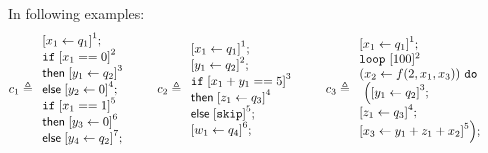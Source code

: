 \documentclass[a4paper,11pt]{article}
\begin{document}
\noindent
In following examples:
\[
c_1 \triangleq
\begin{array}{l}
     \left[x_1 \leftarrow q_1 \right]^1; \\
    \eif \; \left[x_1 ==0 \right]^2\; \\
    \mathsf{then} \; \left[y_1 \leftarrow q_2 \right]^3\; \\
    \mathsf{else} \; \left[y_2 \leftarrow 0 \right]^4; \\
    \eif \; \left[x_1 == 1 \right]^5\; \\
    \mathsf{then} \; \left[ y_3 \leftarrow 0 \right]^6\; \\
    \mathsf{else} \; \left[y_4 \leftarrow q_2 \right]^7; \\
\end{array}
%
%
\hspace{20pt}
%
c_2 \triangleq
\begin{array}{l}
   \left[ x_1 \leftarrow q_1 \right]^1; \\
   \left[y_1 \leftarrow q_2\right]^2 ; \\
    \eif \;\left[ x_1 + y_1 == 5 \right]^3\; \\
    \mathsf{then} \;\left[ z_1 \leftarrow q_3\right]^4 \; \\
    \mathsf{else} \;\left[ \eskip\right]^5 ; \\
   \left[ w_1 \leftarrow q_4 \right]^6; \\
\end{array}
\hspace{20pt}
%
c_3 \triangleq
\begin{array}{l}
     \left[x_1 \leftarrow q_1 \right]^1 ; \\
    \eloop ~ [100]^{2} ~\\
    ( 
 x_2 \leftarrow f( 2 , x_1 , x_3) )
     ~ \edo
    \\
    ~ \Big( 
    \left[y_1 \leftarrow q_2 \right]^3; \\
    \left[z_1 \leftarrow q_3 \right]^4; \\
    \left[x_3 \leftarrow y_1 + z_1 + x_2 \right]^5
    \Big) ;
\end{array}
%
\hspace{20pt}
%
\]
\end{document}
